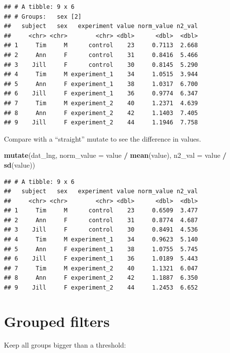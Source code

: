 \documentclass[]{book}
\newenvironment{Shaded}{\begin{snugshade}}{\end{snugshade}}
\newcommand{\KeywordTok}[1]{\textcolor[rgb]{0.13,0.29,0.53}{\textbf{#1}}}
\newcommand{\DataTypeTok}[1]{\textcolor[rgb]{0.13,0.29,0.53}{#1}}
\newcommand{\DecValTok}[1]{\textcolor[rgb]{0.00,0.00,0.81}{#1}}
\newcommand{\StringTok}[1]{\textcolor[rgb]{0.31,0.60,0.02}{#1}}
\newcommand{\OperatorTok}[1]{\textcolor[rgb]{0.81,0.36,0.00}{\textbf{#1}}}
\newcommand{\NormalTok}[1]{#1}
\begin{document}
\begin{verbatim}
## # A tibble: 9 x 6
## # Groups:   sex [2]
##   subject   sex   experiment value norm_value n2_val
##     <chr> <chr>        <chr> <dbl>      <dbl>  <dbl>
## 1     Tim     M      control    23     0.7113  2.668
## 2     Ann     F      control    31     0.8416  5.466
## 3    Jill     F      control    30     0.8145  5.290
## 4     Tim     M experiment_1    34     1.0515  3.944
## 5     Ann     F experiment_1    38     1.0317  6.700
## 6    Jill     F experiment_1    36     0.9774  6.347
## 7     Tim     M experiment_2    40     1.2371  4.639
## 8     Ann     F experiment_2    42     1.1403  7.405
## 9    Jill     F experiment_2    44     1.1946  7.758
\end{verbatim}

Compare with a ``straight'' mutate to see the difference in values.

\begin{Shaded}
\begin{Highlighting}[]
\KeywordTok{mutate}\NormalTok{(dat_lng, }
       \DataTypeTok{norm_value =}\NormalTok{ value }\OperatorTok{/}\StringTok{ }\KeywordTok{mean}\NormalTok{(value), }
       \DataTypeTok{n2_val =}\NormalTok{ value }\OperatorTok{/}\StringTok{ }\KeywordTok{sd}\NormalTok{(value))}
\end{Highlighting}
\end{Shaded}

\begin{verbatim}
## # A tibble: 9 x 6
##   subject   sex   experiment value norm_value n2_val
##     <chr> <chr>        <chr> <dbl>      <dbl>  <dbl>
## 1     Tim     M      control    23     0.6509  3.477
## 2     Ann     F      control    31     0.8774  4.687
## 3    Jill     F      control    30     0.8491  4.536
## 4     Tim     M experiment_1    34     0.9623  5.140
## 5     Ann     F experiment_1    38     1.0755  5.745
## 6    Jill     F experiment_1    36     1.0189  5.443
## 7     Tim     M experiment_2    40     1.1321  6.047
## 8     Ann     F experiment_2    42     1.1887  6.350
## 9    Jill     F experiment_2    44     1.2453  6.652
\end{verbatim}

\section{Grouped filters}\label{grouped-filters}

Keep all groups bigger than a threshold:

\begin{Shaded}
\end{Shaded}
\end{document}
